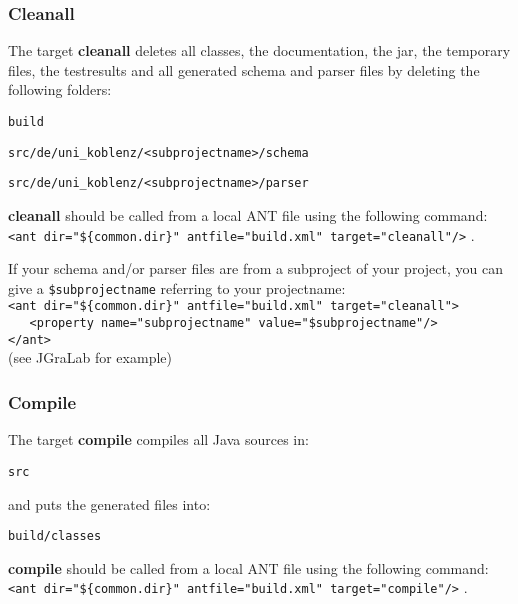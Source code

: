 \documentclass
[
		a4paper,
		twoside, 										
		BCOR10mm,											
		11pt,												
		halfparskip,								
		bigheadings,								
		notitlepage,			
		pdftex											
]
{scrartcl}
\begin{document}
\subsubsection{Cleanall}
\label{Cleanall}

The target \textbf{cleanall} deletes all classes, the documentation, the jar, the temporary files, the testresults and all generated schema and parser files by deleting the following folders:
\footnotesize
\begin{compactitem}
	\item \texttt{build}
	\item \texttt{src/de/uni\_koblenz/<subprojectname>/schema}
	\item \texttt{src/de/uni\_koblenz/<subprojectname>/parser}
\end{compactitem}
\normalsize

\textbf{cleanall} should be called from a local ANT file using the following command: 
\footnotesize
\verb|<ant dir="${common.dir}" antfile="build.xml" target="cleanall"/>|
\normalsize.

If your schema and/or parser files are from a subproject of your project, you can give a \texttt{\$subprojectname} referring to your projectname:\\
\footnotesize
\verb|<ant dir="${common.dir}" antfile="build.xml" target="cleanall">|\\ \verb|   <property name="subprojectname" value="$subprojectname"/>|\\ \verb|</ant>|
\normalsize\\
(see JGraLab for example)


\subsubsection{Compile}
\label{Compile}

The target \textbf{compile} compiles all Java sources in:
\footnotesize
\begin{compactitem}
	\item \texttt{src}
\end{compactitem}
\normalsize
and puts the generated files into:
\footnotesize
\begin{compactitem}
	\item \texttt{build/classes}
\end{compactitem}
\normalsize

\textbf{compile} should be called from a local ANT file using the following command: 
\footnotesize
\verb|<ant dir="${common.dir}" antfile="build.xml" target="compile"/>|
\normalsize.
\end{document}
